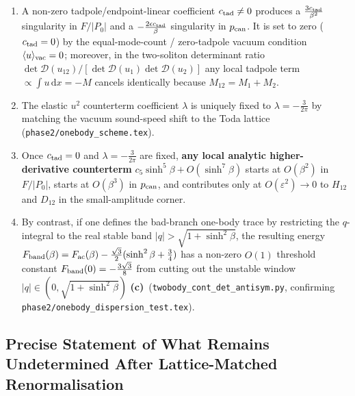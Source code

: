 \documentclass[11pt,a4paper]{article}
\newcommand{\Lc}{\textbf{(c)}}
\newcommand{\script}[1]{\texttt{#1}}
\newcommand{\dd}{\mathrm{d}}
\begin{document}
\begin{enumerate}
\item A non-zero tadpole/endpoint-linear coefficient $c_{\rm tad}\neq 0$ produces a $\frac{3c_{\rm tad}}{\beta^2}$ singularity in $F/|P_0|$ and a $-\frac{2\epsilon c_{\rm tad}}{\beta}$ singularity in $p_{\rm can}$. It is set to zero ($c_{\rm tad}=0$) by the equal-mode-count / zero-tadpole vacuum condition $\langle u\rangle_{\rm vac}=0$; moreover, in the two-soliton determinant ratio $\det\mathcal{D}(u_{12})/[\det\mathcal{D}(u_1)\det\mathcal{D}(u_2)]$ any local tadpole term $\propto\int u\,\dd x=-M$ cancels identically because $M_{12}=M_1+M_2$.
\item The elastic $u^2$ counterterm coefficient $\lambda$ is uniquely fixed to $\lambda=-\frac{3}{2\pi}$ by matching the vacuum sound-speed shift to the Toda lattice (\texttt{phase2/onebody\_scheme.tex}).
\item Once $c_{\rm tad}=0$ and $\lambda=-\frac{3}{2\pi}$ are fixed, \textbf{any local analytic higher-derivative counterterm} $c_5\sinh^5\beta+O(\sinh^7\beta)$ starts at $O(\beta^2)$ in $F/|P_0|$, starts at $O(\beta^3)$ in $p_{\rm can}$, and contributes only at $O(\varepsilon^2)\to 0$ to $H_{12}$ and $D_{12}$ in the small-amplitude corner.
\item By contrast, if one defines the bad-branch one-body trace by restricting the $q$-integral to the real stable band $|q|>\sqrt{1+\sinh^2\beta}$, the resulting energy $F_{\rm band}(\beta)=F_{\rm ac}(\beta)-\frac{\sqrt3}{2}(\sinh^2\beta+\frac34)$ has a non-zero $O(1)$ threshold constant $F_{\rm band}(0)=-\frac{3\sqrt3}{8}$ from cutting out the unstable window $|q|\in(0,\sqrt{1+\sinh^2\beta})$ \Lc\ (\script{twobody\_cont\_det\_antisym.py}, confirming \texttt{phase2/onebody\_dispersion\_test.tex}).
\end{enumerate}

\subsection{Precise Statement of What Remains Undetermined After Lattice-Matched Renormalisation}
\end{document}
